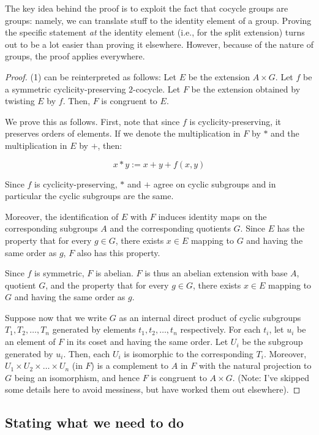 \documentclass[10pt]{amsart}
\begin{document}
The key idea behind the proof is to exploit the fact that cocycle
groups are groups: namely, we can translate stuff to the identity
element of a group. Proving the specific statement {\em at} the
identity element (i.e., for the split extension) turns out to be a lot
easier than proving it elsewhere. However, because of the nature of
groups, the proof applies everywhere.

\begin{proof}
  (1) can be reinterpreted as follows: Let $E$ be the extension $A
  \times G$. Let $f$ be a symmetric cyclicity-preserving
  $2$-cocycle. Let $F$ be the extension obtained by twisting $E$ by
  $f$. Then, $F$ is congruent to $E$.

  We prove this as follows. First, note that since $f$ is
  cyclicity-preserving, it preserves orders of elements. If we denote
  the multiplication in $F$ by $*$ and the multiplication in $E$ by
  $+$, then:

  $$x * y := x + y + f(x,y)$$

  Since $f$ is cyclicity-preserving, $*$ and $+$ agree on cyclic
  subgroups and in particular the cyclic subgroups are the same.

  Moreover, the identification of $E$ with $F$ induces identity maps
  on the corresponding subgroups $A$ and the corresponding quotients
  $G$. Since $E$ has the property that for every $g \in G$, there
  exists $x \in E$ mapping to $G$ and having the same order as $g$,
  $F$ also has this property.

  Since $f$ is symmetric, $F$ is abelian. $F$ is thus an abelian
  extension with base $A$, quotient $G$, and the property that for
  every $g \in G$, there exists $x \in E$ mapping to $G$ and having
  the same order as $g$.

  Suppose now that we write $G$ as an internal direct product of
  cyclic subgroups $T_1, T_2, \dots, T_n$ generated by elements $t_1,
  t_2, \dots, t_n$ respectively. For each $t_i$, let $u_i$ be an
  element of $F$ in its coset and having the same order. Let $U_i$ be
  the subgroup generated by $u_i$. Then, each $U_i$ is isomorphic to
  the corresponding $T_i$. Moreover, $U_1 \times U_2 \times \dots
  \times U_n$ (in $F$) is a complement to $A$ in $F$ with the natural
  projection to $G$ being an isomorphism, and hence $F$ is congruent
  to $A \times G$. (Note: I've skipped some details here to avoid
  messiness, but have worked them out elsewhere).
\end{proof}

\subsection{Stating what we need to do}
\end{document}
